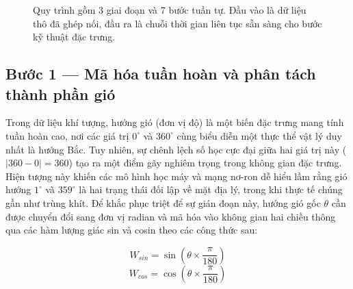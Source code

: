 \begin{figure}[H]
    \caption{Quy trình làm sạch dữ liệu cho mỗi trạm quan trắc}
    \caption*{Quy trình gồm 3 giai đoạn và 7 bước tuần tự. Đầu vào là dữ liệu thô đã ghép nối, đầu ra là chuỗi thời gian liên tục sẵn sàng cho bước kỹ thuật đặc trưng.}
    \label{fig:pipeline_clean}
\end{figure}

\subsection{Bước 1 --- Mã hóa tuần hoàn và phân tách thành phần gió}

Trong dữ liệu khí tượng, hướng gió (đơn vị độ) là một biến đặc trưng mang tính tuần hoàn cao, nơi các giá trị $0^\circ$ và $360^\circ$ cùng biểu diễn một thực thể vật lý duy nhất là hướng Bắc. Tuy nhiên, sự chênh lệch số học cực đại giữa hai giá trị này ($|360 - 0| = 360$) tạo ra một điểm gãy nghiêm trọng trong không gian đặc trưng. Hiện tượng này khiến các mô hình học máy và mạng nơ-ron dễ hiểu lầm rằng gió hướng $1^\circ$ và $359^\circ$ là hai trạng thái đối lập về mặt địa lý, trong khi thực tế chúng gần như trùng khít. Để khắc phục triệt để sự gián đoạn này, hướng gió gốc $\theta$ cần được chuyển đổi sang đơn vị radian và mã hóa vào không gian hai chiều thông qua các hàm lượng giác sin và cosin theo các công thức sau:

\begin{equation}
    W_{sin} = \sin\left(\theta \times \frac{\pi}{180}\right)
\end{equation}
\begin{equation}
    W_{cos} = \cos\left(\theta \times \frac{\pi}{180}\right)
\end{equation}

